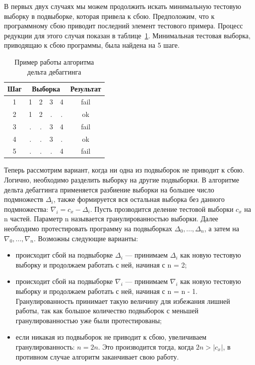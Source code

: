 В первых двух случаях мы можем продолжить искать минимальную тестовую выборку в подвыборке, которая привела к сбою. Предположим, что к программному сбою приводит последний элемент тестового примера. Процесс редукции для этого случая показан в таблице~\ref{tab:ddminex}. Минимальная тестовая выборка, приводящаю к сбою программы, была найдена на 5 шаге.
\begin{table}[]
\center
\caption{\label{tab:ddminex}Пример работы алгоритма дельта дебаггинга}
\begin{tabular}{| c | *{4}{c} | c |}
\hline
\bf Шаг & \multicolumn{4}{|c|}{\bf Выборка} & {\bf Результат}\\
\hline
1 &  1 & 2 & 3 & 4 & fail \\
\hline
2 &  1 & 2 & . & . & ok \\
\hline
3 &  . & . & 3 & 4 & fail \\
\hline
4 &  . & . & 3 & . & ok \\
\hline
5 &  . & . & . & 4 & fail \\
\hline
\end{tabular}
\end{table}

Теперь рассмотрим вариант, когда ни одна из подвыборок не приводит к сбою. Логично, необходимо разделить выборку на другие подвыборки. В алгоритме дельта дебаггинга применяется разбиение выборки на большее число подмножеств $\Delta_i$, также формируется вся остальная выборка без данного подмножества: $\nabla_i = c_x - \Delta_i$. Пусть прозводится деление тестовой выборки $c_x$ на n частей. Параметр n называется гранулированностью выборки. Далее необходимо протестировать программу на подвыборках $\Delta_0,...,\Delta_n$, а затем на $\nabla_0,...,\nabla_n$. Возможны следующие варианты:
\begin{itemize}
\item происходит сбой на подвыборке $\Delta_i$ --- принимаем $\Delta_i$ как новую тестовую выборку и продолжаем работать с ней, начиная с n = 2;
\item происходит сбой на подвыборке $\nabla_i$ --- принимаем $\nabla_i$ как новую тестовую выборку и продолжаем работать с ней, начиная с n = n - 1. Гранулированность принимает такую величину для избежания лишней работы, так как большое количество подвыборок с меньшей гранулированностью уже были протестированы;
\item если никакая из подвыборок не приводит к сбою, увеличиваем гранулированность: $n = 2n$. Это производится тогда, когда $2n > |c_x|$, в противном случае алгоритм заканчивает свою работу.
\end{itemize}

